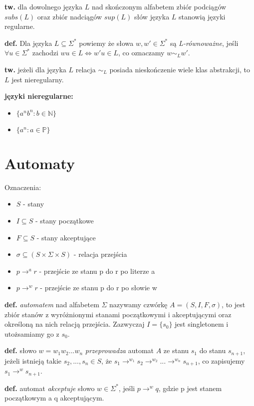 \documentclass[draft]{article}
\newcommand{\tw}{\textbf{tw. }}
\newcommand{\deff}{\textbf{def. }}
\begin{document}
	\tw dla dowolnego języka $L$ nad skończonym alfabetem zbiór podciągów $subs(L)$ oraz zbiór nadciągów $sup(L)$ słów języka $L$ stanowią języki regularne.
	
	\deff Dla języka $L \subseteq \Sigma^*$ powiemy że słowa $w,w' \in \Sigma^*$ są \textit{L-równoważne}, jeśli $\forall u \in \Sigma^*$ zachodzi $wu \in L \iff w'u \in L$, co oznaczamy $w \sim_L w'$.
	
	\tw jeżeli dla języka $L$ relacja $\sim_L$ posiada nieskończenie wiele klas abstrakcji, to $L$ jest nieregularny.
	
	\textbf{języki nieregularne:}
		\begin{itemize}
			\item $\{a^n b^n : b \in \mathbb{N}\}$
			\item $\{a^n : a \in \mathbb{P}\}$
		\end{itemize}
	
\section{Automaty}
	Oznaczenia:
		\begin{itemize}
			\item $S$ - stany
			\item $I \subseteq S$ - stany początkowe
			\item $F \subseteq S$ - stany akceptujące
			\item $\sigma \subseteq (S \times \Sigma \times S)$ - relacja przejścia
			\item $p \rightarrow^a r$ - przejście ze stanu p do r po literze a 
			\item $p \rightarrow^w r$ - przejście ze stanu p do r po słowie w
		\end{itemize}
	
	\deff {} \textit{automatem} nad alfabetem $\Sigma$ nazywamy czwórkę $A = (S, I, F, \sigma)$, to jest zbiór stanów z wyróżnionymi stanami początkowymi i akceptującymi oraz określoną na nich relacją przejścia. Zazwyczaj $I = \{s_0\}$ jest singletonem i utożsamiamy go z $s_0$.
	
	\deff słowo $w = w_1 w_2 ... w_n$ \textit{przeprowadza} automat $A$ ze stanu $s_1$ do stanu $s_{n+1}$, jeżeli istnieją takie $s_2,..., s_n \in S$, że $s_1 \rightarrow^{w_1} s_2 \rightarrow^{w_2} ... \rightarrow^{w_n} s_{n+1}$, co zapisujemy $s_1 \rightarrow^w s_{n+1}$.
	
	\deff automat \textit{akceptuje} słowo $w \in \Sigma^*$, jeśli $p \rightarrow^w q$, gdzie p jest stanem początkowym a q akceptującym.
	
\end{document}
